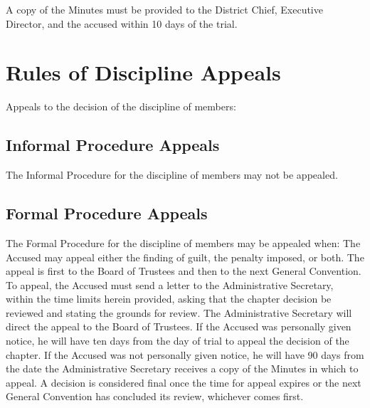 A copy of the Minutes must be provided to the District Chief, Executive
Director, and the accused within 10 days of the trial.


\section{Rules of Discipline Appeals}

Appeals to the decision of the discipline of members:

\subsection{Informal Procedure Appeals}

The Informal Procedure for the discipline of members may not be appealed.

\subsection{Formal Procedure Appeals}

The Formal Procedure for the discipline of members may be appealed when:
The Accused may appeal either the finding of guilt, the penalty imposed, or
both.
The appeal is first to the Board of Trustees and then to the next General
Convention.
To appeal, the Accused must send a letter to the Administrative Secretary,
within the time limits herein provided, asking that the chapter decision be
reviewed and stating the grounds for review.
The Administrative Secretary will direct the appeal to the Board of Trustees.
If the Accused was personally given notice, he will have ten days from the day
of trial to appeal the decision of the chapter.
If the Accused was not personally given notice, he will have 90 days from the
date the Administrative Secretary receives a copy of the Minutes in which to
appeal.
A decision is considered final once the time for appeal expires or the next
General Convention has concluded its review, whichever comes first.


